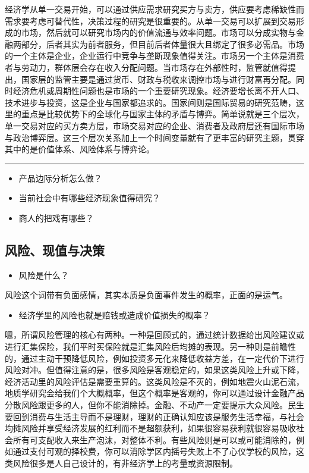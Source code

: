 \documentclass[
  letterpaper,
  DIV=11,
  numbers=noendperiod]{scrreprt}
\providecommand{\tightlist}{%
  \setlength{\itemsep}{0pt}\setlength{\parskip}{0pt}}\usepackage{longtable,booktabs,array}
\begin{document}
经济学从单一交易开始，可以通过供应需求研究买方与卖方，供应要考虑稀缺性而需求要考虑可替代性，决策过程的研究是很重要的。从单一交易可以扩展到交易形成的市场，然后就可以研究市场内的价值流通与效率问题。市场可以分成实物与金融两部分，后者其实为前者服务，但目前后者体量很大且绑定了很多必需品。市场的一个主体是企业，企业运行中竞争与垄断现象值得关注。市场另一个主体是消费者与劳动力，群体层会存在收入分配问题。当市场存在外部性时，监管就值得提出，国家层的监管主要是通过货币、财政与税收来调控市场与进行财富再分配。同时经济危机或周期性问题也是市场的一个重要研究现象。经济要增长离不开人口、技术进步与投资，这是企业与国家都追求的。国家间则是国际贸易的研究范畴，这里的重点是比较优势下的全球化与国家主体的矛盾与博弈。简单说就是三个层次，单一交易对应的买方卖方层，市场交易对应的企业、消费者及政府层还有国际市场与政治博弈层。这三个层次关系加上一个时间变量就有了更丰富的研究主题，贯穿其中的是价值体系、风险体系与博弈论。

\begin{center}\rule{0.5\linewidth}{0.5pt}\end{center}

\begin{itemize}
\tightlist
\item
  产品边际分析怎么做？
\item
  当前社会中有哪些经济现象值得研究？
\item
  商人的把戏有哪些？
\end{itemize}

\subsection{风险、现值与决策}\label{ux98ceux9669ux73b0ux503cux4e0eux51b3ux7b56}

\begin{itemize}
\tightlist
\item
  风险是什么？
\end{itemize}

风险这个词带有负面感情，其实本质是负面事件发生的概率，正面的是运气。

\begin{itemize}
\tightlist
\item
  经济学里的风险也就是赔钱或造成价值损失的概率？
\end{itemize}

嗯，所谓风险管理的核心有两种。一种是回顾式的，通过统计数据给出风险建议或进行汇集保险，我们平时买保险就是汇集风险后均摊的表现。另一种则是前瞻性的，通过主动干预降低风险，例如投资多元化来降低收益方差，在一定代价下进行风险对冲。但值得注意的是，很多风险是客观稳定的，如果这类风险上升或下降，经济活动里的风险评估是需要重算的。这类风险是不灭的，例如地震火山泥石流，地质学研究会给我们个大概概率，但这个概率是客观的，你可以通过设计金融产品分散风险跟更多的人，但你不能消除掉。金融、不动产一定要提示大众风险。民生要回到消费与生活主导而不是理财，理财的正确认知应该是服务生活幸福，与社会均摊风险并享受经济发展的红利而不是超额获利，如果很容易获利就很容易吸收社会所有可支配收入来生产泡沫，对整体不利。有些风险则是可以或可能消除的，例如通过支付可观的择校费，你可以消除学区内摇号失败上不了心仪学校的风险，这类风险很多是人自己设计的，有非经济学上的考量或资源限制。
\end{document}
